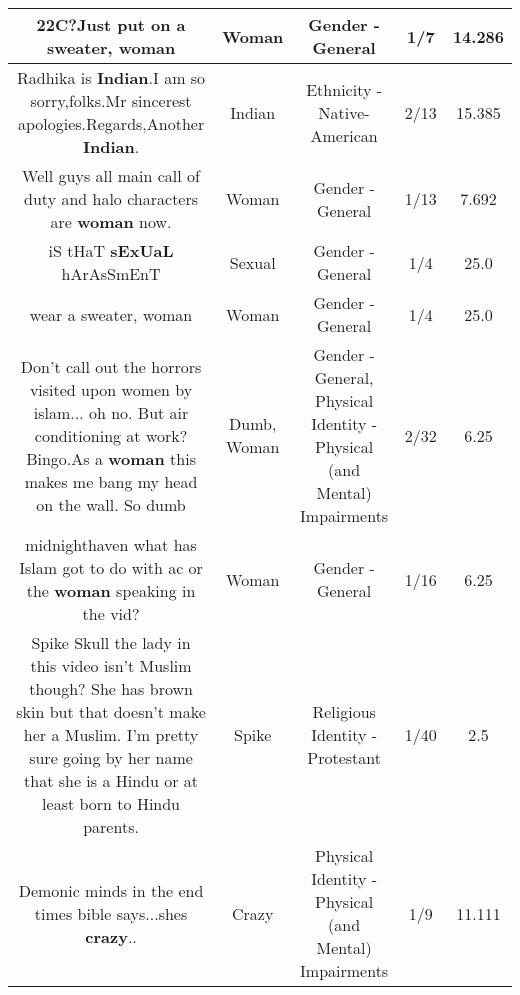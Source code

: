 \documentclass[11pt]{article}
\newlength\mylength
\begin{document}
\begin{center}
\begin{longtable}{|C{.65\mylength}|C{.30\mylength}|C{.12\mylength}|C{.12\mylength}|C{.12\mylength}|}
  \small 22C?Just put on a sweater, woman\normalsize   & Woman & Gender - General & 1/7 & 14.286 \\  \hline
  \small Radhika is \textbf{Indian}.I am so sorry,folks.Mr sincerest apologies.Regards,Another \textbf{Indian}.\normalsize   & Indian & Ethnicity - Native-American & 2/13 & 15.385 \\  \hline
  \small Well guys all main call of duty and halo characters are \textbf{woman} now.\normalsize   & Woman & Gender - General & 1/13 & 7.692 \\  \hline
  \small iS tHaT \textbf{sExUaL} hArAsSmEnT\normalsize   & Sexual & Gender - General & 1/4 & 25.0 \\  \hline
  \small wear a sweater, woman\normalsize   & Woman & Gender - General & 1/4 & 25.0 \\  \hline
  \small Don't call out the horrors visited upon women by islam... oh no. But  air conditioning at work? Bingo.As a \textbf{woman} this makes me bang my head on the wall. So dumb\normalsize   & Dumb, Woman & Gender - General, Physical Identity - Physical (and Mental) Impairments & 2/32 & 6.25 \\  \hline
  \small midnighthaven what has Islam got to do with ac or the \textbf{woman} speaking in the vid?\normalsize   & Woman & Gender - General & 1/16 & 6.25 \\  \hline
  \small Spike Skull the lady in this video isn't Muslim though? She has brown skin but that doesn't make her a Muslim. I'm pretty sure going by her name that she is a Hindu or at least born to Hindu parents.\normalsize   & Spike & Religious Identity - Protestant & 1/40 & 2.5 \\  \hline
  \small Demonic minds in the end times bible says...shes \textbf{crazy}..\normalsize   & Crazy & Physical Identity - Physical (and Mental) Impairments & 1/9 & 11.111 \\  \hline

\end{longtable}
\end{center}
\end{document}

